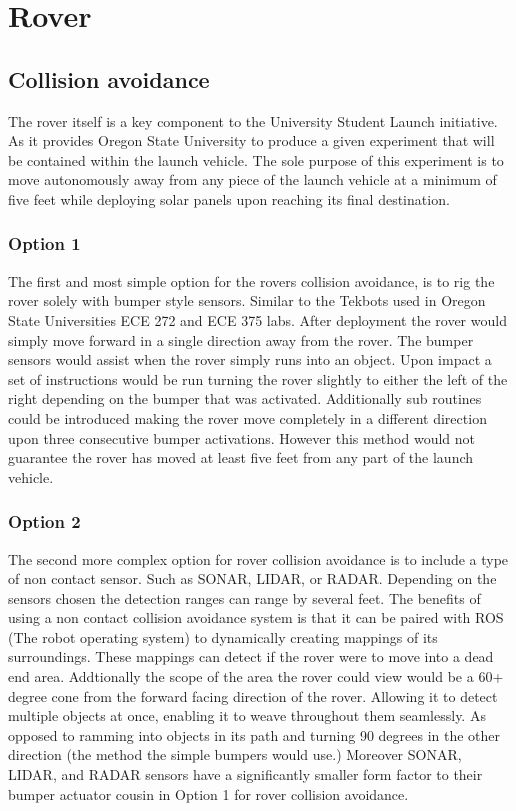 \documentclass[onecolumn, draftclsnofoot,10pt, compsoc]{IEEEtran}
\begin{document}
    \section{Rover}
    \subsection{Collision avoidance}
    The rover itself is a key component to the University Student Launch initiative. As it provides Oregon State University to produce a given experiment that will be contained within the launch vehicle. The sole purpose of this experiment is to move autonomously away from any piece of the launch vehicle at a minimum of five feet while deploying solar panels upon reaching its final destination.
    \subsubsection{Option 1}
    The first and most simple option for the rovers collision avoidance, is to rig the rover solely with bumper style sensors. Similar to the Tekbots used in Oregon State Universities ECE 272 and ECE 375 labs. After deployment the rover would simply move forward in a single direction away from the rover. The bumper sensors would assist when the rover simply runs into an object. Upon impact a set of instructions would be run turning the rover slightly to either the left of the right depending on the bumper that was activated. Additionally sub routines could be introduced making the rover move completely in a different direction upon three consecutive bumper activations. However this method would not guarantee the rover has moved at least five feet from any part of the launch vehicle.
    \subsubsection{Option 2}
    The second more complex option for rover collision avoidance is to include a type of non contact sensor. Such as SONAR, LIDAR, or RADAR. Depending on the sensors chosen the detection ranges can range by several feet. The benefits of using a non contact collision avoidance system is that it can be paired with ROS (The robot operating system) to dynamically creating mappings of its surroundings. These mappings can detect if the rover were to move into a dead end area. Addtionally the scope of the area the rover could view would be a 60+ degree cone from the forward facing direction of the rover. Allowing it to detect multiple objects at once, enabling it to weave throughout them seamlessly. As opposed to ramming into objects in its path and turning 90 degrees in the other direction (the method the simple bumpers would use.) Moreover SONAR, LIDAR, and RADAR sensors have a significantly smaller form factor to their bumper actuator cousin in Option 1 for rover collision avoidance.
\end{document}
